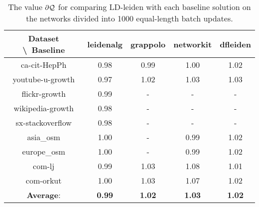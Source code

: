 \begin{table}[H]
	\centering
	\begin{tabular}{|c|c|c|c|c|}
		\hline
		Dataset \textbackslash\ Baseline & leidenalg & grappolo & networkit & dfleiden \\
		\hline
		ca-cit-HepPh & 0.98 & 0.99 & 1.00 & 1.02 \\
		\hline
		youtube-u-growth & 0.97 & 1.02 & 1.03 & 1.03 \\
		\hline
		flickr-growth & 0.99 & - & - & - \\
		\hline
		wikipedia-growth & 0.98 & - & - & - \\
		\hline
		sx-stackoverflow & 0.98 & - & - & - \\
		\hline
		asia\_osm & 1.00 & - & 0.99 & 1.02 \\
		\hline
		europe\_osm & 1.00 & - & 0.99 & 1.02 \\
		\hline
		com-lj & 0.99 & 1.03 & 1.08 & 1.01 \\
		\hline
		com-orkut & 1.00 & 1.03 & 1.07 & 1.02 \\
		\hline
		\textbf{Average}: & \textbf{0.99} & \textbf{1.02} & \textbf{1.03} & \textbf{1.02} \\
		\hline
	\end{tabular}
\caption{The value $\partial\mathcal{Q}$ for comparing LD-leiden with each baseline solution on the networks divided into 1000 equal-length batch updates.}
\label{T:lastM:1000 batches}
\end{table}